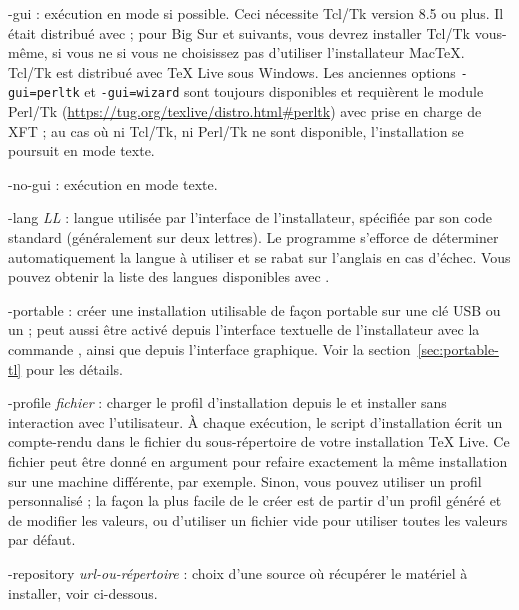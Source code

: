 \documentclass[german, english, french, 12pt]{article}
\renewcommand{\TL}{\TeX{} Live\xspace}%
\begin{document}
\begin{ttdescription}
\item[-gui] : exécution en mode \GUI{} si possible. Ceci nécessite Tcl/Tk
  version 8.5 ou plus. Il était distribué avec \macOS ; pour Big Sur et
  suivants, vous devrez installer Tcl/Tk vous-même, si vous ne si vous ne
  choisissez pas d'utiliser l'installateur MacTeX. Tcl/Tk est distribué avec
  \TL{} sous Windows. Les anciennes options \texttt{-gui=perltk} et
  \texttt{-gui=wizard} sont toujours disponibles et requièrent le module Perl/Tk
  (\url{https://tug.org/texlive/distro.html#perltk}) avec prise en charge de
XFT ; au cas où ni Tcl/Tk, ni Perl/Tk ne sont disponible, l'installation se
poursuit en mode texte.

\item[-no-gui] : exécution en mode texte.

\item[-lang {\sl LL}] : langue utilisée par l'interface de l'installateur,
  spécifiée par son code standard (généralement sur deux lettres).  Le programme
  s'efforce de déterminer automatiquement la langue à utiliser et se rabat sur
  l'anglais en cas d'échec. Vous pouvez obtenir la liste des langues disponibles
  avec .

\item[-portable] : créer une installation utilisable de façon portable sur une
  clé USB ou un \DVD ; peut aussi être activé depuis l'interface textuelle de
  l'installateur avec la commande , ainsi que depuis l'interface
  graphique.  Voir la section~\ref{sec:portable-tl} pour les détails.

\item[-profile {\sl fichier}] : charger le profil d'installation depuis le
   et installer sans interaction avec l'utilisateur.  À chaque
  exécution, le script d'installation écrit un compte-rendu dans le fichier
   du sous-répertoire  de votre
  installation \TL. Ce fichier peut être donné en argument pour refaire
  exactement la même installation sur une machine différente, par
  exemple. Sinon, vous pouvez utiliser un profil personnalisé ; la façon la plus
  facile de le créer est de partir d'un profil généré et de modifier les
  valeurs, ou d'utiliser un fichier vide pour utiliser toutes les valeurs par
  défaut.

\item[-repository {\sl url-ou-répertoire}] : choix d'une source où récupérer le
  matériel à installer, voir ci-dessous.


\end{ttdescription}
\end{document}
